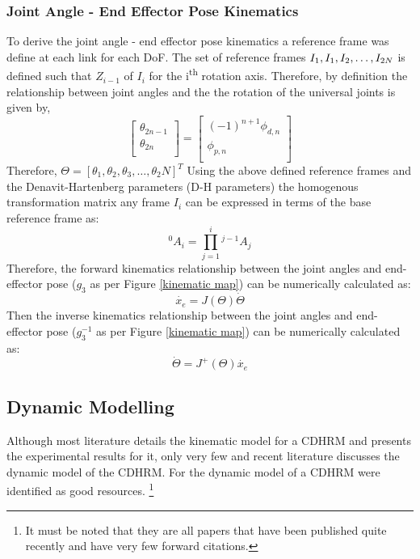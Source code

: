 \documentclass[a4paper,12pt]{report}
\begin{document}
\subsubsection{Joint Angle - End Effector Pose Kinematics}
To derive the joint angle - end effector pose kinematics a reference frame was define at each link for each DoF. The set of reference frames ${I_1},{I_1},{I_2},\ldots\\,{I_{2N}}$ is defined such that $Z_{i-1}$ of ${I_i}$ for the i\textsuperscript{th} rotation axis. Therefore, by definition the relationship between joint angles and the the rotation of the universal joints is given by,
\begin{equation}
 \begin{bmatrix}
\theta_{2n-1} \\
\theta_{2n} \\
\end{bmatrix}
= 
\begin{bmatrix}
(-1)^{n+1} \phi_{d,n}\\
\phi_{p,n}\\
\end{bmatrix}
\label{phi to theta}
\end{equation}
Therefore, $\Theta=[\theta_1,\theta_2,\theta_3,\ldots,\theta_2N]^T$
Using the above defined reference frames and the Denavit-Hartenberg parameters (D-H parameters) the homogenous transformation matrix any frame ${I_i}$ can be expressed in terms of the base reference frame as:
\begin{equation}
{}^{0}A_{i}=\prod_{j=1}^{i} {}^{j-1}A_j
\end{equation}
Therefore, the forward kinematics relationship between the joint angles and end-effector pose ($g_{3}$ as per Figure \ref{kinematic map}) can be numerically calculated as:
\begin{equation}
\dot{x_e}= J(\Theta)\dot{\Theta}
\label{g3}
\end{equation}
Then the inverse kinematics relationship between the joint angles and end-effector pose ($g_{3}^{-1}$ as per Figure \ref{kinematic map}) can be numerically calculated as:
\begin{equation}
\dot{\Theta}= J^{+}(\Theta)\dot{x_e}
\label{g3_inv}
\end{equation}

\subsection{Dynamic Modelling}
Although most literature details the kinematic model for a CDHRM and presents the experimental results for it, only very few and recent literature discusses the dynamic model of the CDHRM. For the dynamic model of a CDHRM \cite{RN30, RN51, mu_liu_xu_lou_liang_2019} were identified as good resources. \footnote{It must be noted that they are all papers that have been published quite recently and have very few forward citations.}
\end{document}
